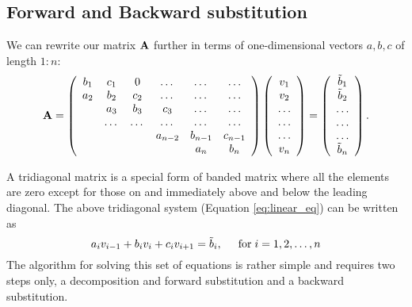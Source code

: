 \documentclass[11pt,a4wide]{article}
\begin{document}
\subsection{Forward and Backward substitution}
We can rewrite our matrix ${\bf A}$ further in terms of one-dimensional vectors $a,b,c$  of length $1:n$:
\begin{equation}
    {\bf A} = \left(\begin{array}{cccccc}
                           b_1& c_1 & 0 &\dots   & \dots &\dots \\
                           a_2 & b_2 & c_2 &\dots &\dots &\dots \\
                           & a_3 & b_3 & c_3 & \dots & \dots \\
                           & \dots   & \dots &\dots   &\dots & \dots \\
                           &   &  &a_{n-2}  &b_{n-1}& c_{n-1} \\
                           &    &  &   &a_n & b_n \\
                      \end{array} \right)\left(\begin{array}{c}
                           v_1\\
                           v_2\\
                           \dots \\
                          \dots  \\
                          \dots \\
                           v_n\\
                      \end{array} \right)
  =\left(\begin{array}{c}
                           \tilde{b}_1\\
                           \tilde{b}_2\\
                           \dots \\
                           \dots \\
                          \dots \\
                           \tilde{b}_n\\
                      \end{array} \right).
\end{equation}

A tridiagonal matrix is a special form of banded matrix where all the elements are zero except for those on and immediately above and below the leading diagonal. The above tridiagonal system (Equation \ref{eq:linear_eq}) can be written as
\begin{equation}
  a_iv_{i-1}+b_iv_i+c_iv_{i+1} = \tilde{b}_i, \hspace{0.5cm} \mathrm{for} \hspace{0.1cm} i=1,2,\dots,n
\end{equation}
The algorithm for solving this set of equations is rather simple and requires two steps only, a decomposition and forward substitution and a backward substitution. 
\end{document}
